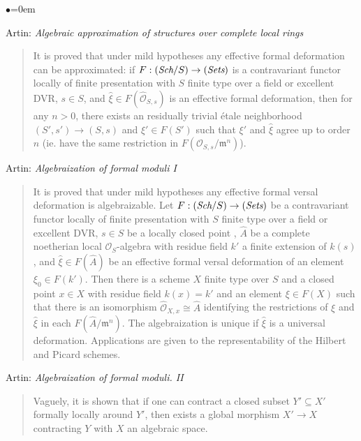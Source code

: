 \begin{list}{$\bullet$}{\leftmargin=0em}
\item Artin: \emph{Algebraic approximation of structures over 
complete local rings} \cite{artin_approximation}
\begin{quote}
It is proved that under mild hypotheses any effective formal deformation can be 
approximated: if $F: (\textit{Sch}/S) \to (\textit{Sets})$
is a contravariant functor 
locally of finite presentation with $S$ finite type over a field or excellent 
DVR, $s \in S$, and $\hat{\xi} \in F(\hat{\mathcal{O}}_{S,s})$ is an effective 
formal 
deformation, then for any $n > 0$, there exists an residually trivial \'etale 
neighborhood $(S',s') \to (S,s)$ and $\xi' \in F(S')$ such that $\xi'$ and 
$\hat{\xi}$ agree up to order $n$ (ie. have the same restriction in
$F(\mathcal{O}_{S,s} / \mathfrak m^n)$).
\end{quote}
\smallskip
\item
Artin: \emph{Algebraization of formal moduli I} \cite{artin_algebraizationI}
\begin{quote}
It is proved that under mild hypotheses any effective formal versal deformation 
is algebraizable. Let $F: (\textit{Sch}/S) \to (\textit{Sets})$ be a 
contravariant functor 
locally of finite presentation with $S$ finite type over a field or excellent 
DVR, $s \in S$ be a locally closed point , $\hat A$ be a complete noetherian 
local $\mathcal{O}_S$-algebra with residue field $k'$ a finite extension of 
$k(s)$, 
and $\hat{\xi} \in F(\hat A)$ be an effective formal versal deformation of an 
element $\xi_0 \in F(k')$. Then there is a scheme $X$ finite type over $S$ and 
a closed point $x \in X$ with residue field $k(x) = k'$ and an element $\xi \in 
F(X)$ such that there is an isomorphism $\hat{\mathcal{O}}_{X,x} \cong \hat{A}$ 
identifying the restrictions of $\xi$ and $\hat{\xi}$ in each $F(\hat A / 
\mathfrak m^n)$. The algebraization is unique if $\hat{\xi}$ is a universal 
deformation. Applications are given to the representability of the Hilbert
and Picard schemes.
\end{quote}
\smallskip
\item Artin: \emph{Algebraization of formal moduli. II} 
\cite{artin_algebraizationII}
\begin{quote}
Vaguely, it is shown that if one can contract a closed subset $Y' \subseteq X'$ 
formally locally around $Y'$, then exists a global morphism $X' \to X$ 
contracting $Y$ with $X$ an algebraic space. 
\end{quote}
\smallskip

\end{list}
